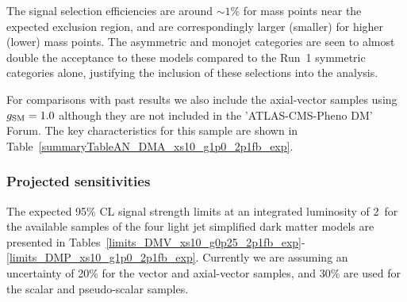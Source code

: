 The signal selection efficiencies are around $\sim 1$\% for mass points near the expected exclusion
region, and are correspondingly larger (smaller) for higher (lower) mass points.
The asymmetric and monojet categories are seen to almost double the acceptance
to these models compared to the Run~1 symmetric categories alone, justifying the
inclusion of these selections into the analysis.




\clearpage 
 \clearpage
 \clearpage
 \clearpage
 \clearpage

\clearpage
For comparisons with past results we also include the axial-vector samples using $g_{\rm SM} = 1.0$ although they are not included in the 
'ATLAS-CMS-Pheno DM' Forum. The key characteristics for this sample are shown in Table~\ref{summaryTableAN_DMA_xs10_g1p0_2p1fb_exp}.

 \clearpage



\subsubsection{Projected sensitivities}

The expected 95\% CL signal strength limits at an integrated luminosity of 2~\ifb for
the available samples of the four light jet simplified dark matter models are
presented in
Tables~\ref{limits_DMV_xs10_g0p25_2p1fb_exp}-\ref{limits_DMP_xs10_g1p0_2p1fb_exp}.
Currently we are assuming an uncertainty of 20\% for the vector and axial-vector samples, and 30\% are used 
for the scalar and pseudo-scalar samples.





\clearpage
%
% 
%
%

